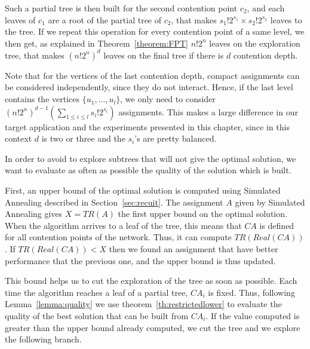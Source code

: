 Such a partial tree is then built for the second contention point $c_2$, and each leaves of $c_1$ are a root of the partial tree of $c_2$, that makes $s_1!2^{s_1} \times s_2!2^{s_2}$ leaves to the tree. If we repeat this operation for every contention point of a same level, we then get, as explained in Theorem~\ref{theorem:FPT} $n!2^n$ leaves on the exploration tree, that makes $ (n!2^{n})^{d}$ leaves on the final tree if there is $d$ contention depth.

Note that for the vertices of the last contention depth, compact assignments can be considered independently, since
they do not interact. Hence, if the last level contains the vertices $\{u_1,\dots,u_l\}$, we only need to consider $(n!2^{n})^{d-1}(\sum_{1 \leq i\leq l} s_{i}!2^{s_i})$ assignments. This makes a large difference in our target application and the experiments presented in this chapter, since in this context $d$ is two or three and the $s_i$'s are pretty balanced.


In order to avoid to explore subtrees that will not give the optimal solution, we want to evaluate as often as possible the quality of the solution which is built.

First, an upper bound of the optimal solution is computed using Simulated Annealing described in Section~\ref{sec:recuit}. The assignment $A$ given by Simulated Annealing gives $X =TR(A)$ the first upper bound on the optimal solution.
When the algorithm arrives to a leaf of the tree, this means that $CA$ is defined for all contention points of the network. Thus, it can compute $TR(Real(CA))$. If $TR(Real(CA)) < X$ then we found an assignment that have better performance that the previous one, and the upper bound is thus updated.

This bound helps us to cut the exploration of the tree as soon as possible. Each time the algorithm reaches a leaf of a partial tree, $CA_i$ is fixed. Thus, following Lemma~\ref{lemma:quality} we use theorem~\ref{th:restrictedlower} to evaluate the quality of the best solution that can be built from $CA_i$. If the value computed is greater than the upper bound already computed, we cut the tree and we explore the following branch.







